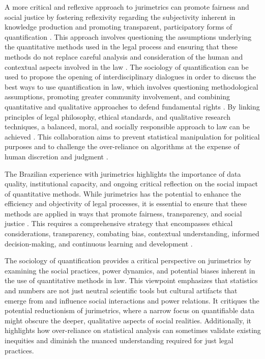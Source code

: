 A more critical and reflexive approach to jurimetrics can promote fairness and social justice by fostering reflexivity regarding the subjectivity inherent in knowledge production and promoting transparent, participatory forms of quantification \cite{10.1007/s11186-021-09453-1,loevinger1959}. This approach involves questioning the assumptions underlying the quantitative methods used in the legal process and ensuring that these methods do not replace careful analysis and consideration of the human and contextual aspects involved in the law \cite{10.1007/s11186-021-09453-1,loevinger1959}. The sociology of quantification can be used to propose the opening of interdisciplinary dialogues in order to discuss the best ways to use quantification in law, which involves questioning methodological assumptions, promoting greater community involvement, and combining quantitative and qualitative approaches to defend fundamental rights \cite{10.1007/s11186-021-09453-1,loevinger1959}. By linking principles of legal philosophy, ethical standards, and qualitative research techniques, a balanced, moral, and socially responsible approach to law can be achieved \cite{10.1007/s11186-021-09453-1,loevinger1959}. This collaboration aims to prevent statistical manipulation for political purposes and to challenge the over-reliance on algorithms at the expense of human discretion and judgment \cite{10.1007/s11186-021-09453-1,loevinger1959}.

The Brazilian experience with jurimetrics highlights the importance of data quality, institutional capacity, and ongoing critical reflection on the social impact of quantitative methods. While jurimetrics has the potential to enhance the efficiency and objectivity of legal processes, it is essential to ensure that these methods are applied in ways that promote fairness, transparency, and social justice \cite{10.1590/data.2022.65.3.267,loevinger1959}. This requires a comprehensive strategy that encompasses ethical considerations, transparency, combating bias, contextual understanding, informed decision-making, and continuous learning and development \cite{10.1590/data.2022.65.3.267,loevinger1959}.

The sociology of quantification provides a critical perspective on jurimetrics by examining the social practices, power dynamics, and potential biases inherent in the use of quantitative methods in law. This viewpoint emphasizes that statistics and numbers are not just neutral scientific tools but cultural artifacts that emerge from and influence social interactions and power relations. It critiques the potential reductionism of jurimetrics, where a narrow focus on quantifiable data might obscure the deeper, qualitative aspects of social realities. Additionally, it highlights how over-reliance on statistical analysis can sometimes validate existing inequities and diminish the nuanced understanding required for just legal practices.

